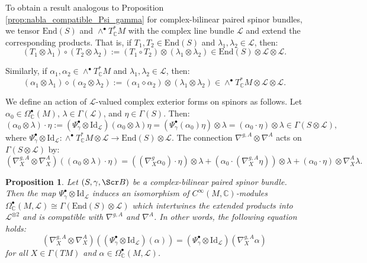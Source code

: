 \documentclass[10pt,a4paper,twoside,reqno]{amsart}
\theoremstyle{plain}
\newtheorem{prop}[thm]{Proposition}
\theoremstyle{definition}
\theoremstyle{remark}
\newcommand{\End}{\mathrm{End}}
\def\C{\mathbb{C}}
\def\Id{\mathrm{Id}}
\def\scB{\Scr B}
\def\cL{\mathcal{L}}
\begin{document}
To obtain a result analogous to Proposition \ref{prop:nabla_compatible_Psi_gamma} for complex-bilinear paired spinor bundles, we tensor $\End(S)$ and $\wedge^{\bullet}T^*_\C M$ with the complex line bundle $\cL$ and extend the corresponding products. That is, if $T_1,T_2\in\End(S)$ and $\lambda_1,\lambda_2\in\cL$, then: $$(T_1\otimes\lambda_1)\circ(T_2\otimes\lambda_2):=(T_1\circ T_2)\otimes(\lambda_1\otimes\lambda_2)\in\End(S)\otimes\cL\otimes\cL.$$

Similarly, if $\alpha_1,\alpha_2\in\wedge^{\bullet}T^*_\C M$ and $\lambda_1,\lambda_2\in\cL$, then: $$(\alpha_1\otimes\lambda_1)\diamond(\alpha_2\otimes\lambda_2):=(\alpha_1\diamond\alpha_2)\otimes(\lambda_1\otimes\lambda_2)\in\wedge^{\bullet}T^*_\C M\otimes\cL\otimes\cL.$$

We define an action of $\cL$-valued complex exterior forms on spinors as follows. Let $\alpha_0\in\Omega^{\bullet}_\C(M)$, $\lambda\in\Gamma(\cL)$, and $\eta\in\Gamma(S)$. Then: $$(\alpha_0\otimes\lambda)\cdot\eta:=(\Psi^{\bullet}_\gamma\otimes\Id_{\cL})(\alpha_0\otimes\lambda)\eta=(\Psi^{\bullet}_\gamma(\alpha_0)\eta)\otimes\lambda=(\alpha_0\cdot\eta)\otimes\lambda\in\Gamma(S\otimes\cL),$$ where $\Psi^{\bullet}_\gamma\otimes\Id_{\cL}\colon\wedge^{\bullet}T^*_\C M\otimes\cL\to\End(S)\otimes\cL$. The connection $\nabla^{g,A}\otimes\nabla^{A}$ acts on $\Gamma(S\otimes\cL)$ by: $$(\nabla^{g,A}_X\otimes\nabla^{A}_X)((\alpha_0\otimes\lambda)\cdot\eta)=((\nabla^g_X\alpha_0)\cdot\eta)\otimes\lambda+(\alpha_0\cdot(\nabla^{g,A}_X\eta))\otimes\lambda+(\alpha_0\cdot\eta)\otimes\nabla^{A}_X\lambda.$$

\begin{prop}\label{prop:L-valued_compatibility}
Let $(S,\gamma,\scB)$ be a complex-bilinear paired spinor bundle. Then the map $\Psi^{\bullet}_\gamma\otimes\Id_{\cL}$ induces an isomorphism of $C^{\infty}(M,\C)$-modules $\Omega^{\bullet}_\C(M,\cL) \cong \Gamma(\End(S)\otimes\cL)$ which intertwines the extended products into $\cL^{\otimes 2}$ and is compatible with $\nabla^{g,A}$ and $\nabla^{A}$. In other words, the following equation holds: 
\begin{equation*}
(\nabla^{g,A}_X\otimes\nabla^{A}_X)((\Psi^{\bullet}_\gamma\otimes\Id_{\cL})(\alpha))=(\Psi^{\bullet}_\gamma\otimes\Id_{\cL})(\nabla^{g,A}_X\alpha)
\end{equation*}
for all $X\in\Gamma(TM)$ and $\alpha\in\Omega^{\bullet}_\C(M,\cL)$.
\end{prop}
\end{document}
